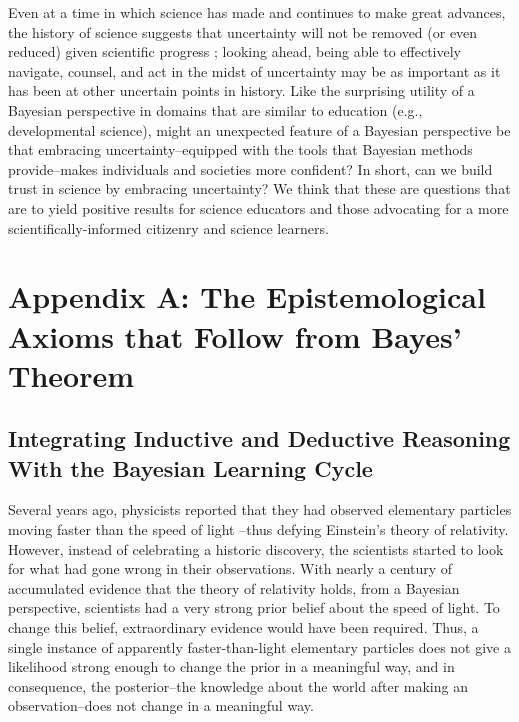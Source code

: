 \documentclass[man, floatsintext]{apa7} %
\begin{document}
Even at a time in which science has made and continues to make great advances, the history of science suggests that uncertainty will not be removed (or even reduced) given scientific progress \parencite{fara2010science}; looking ahead, being able to effectively navigate, counsel, and act in the midst of uncertainty may be as important as it has been at other uncertain points in history. Like the surprising utility of a Bayesian perspective in domains that are similar to education (e.g., developmental science), might an unexpected feature of a Bayesian perspective be that embracing uncertainty--equipped with the tools that Bayesian methods provide--makes individuals and societies more confident? In short, can we build trust in science by embracing uncertainty? We think that these are questions that are  to yield positive results for science educators and those advocating for a more scientifically-informed citizenry and science learners. \\

\printbibliography

\newpage

\section{Appendix A: The Epistemological Axioms that Follow from Bayes' Theorem}

\subsection{Integrating Inductive and Deductive Reasoning With the Bayesian Learning Cycle}

Several years ago, physicists reported that they had observed elementary particles moving faster than the speed of light \parencite{b11}--thus defying Einstein’s theory of relativity. However, instead of celebrating a historic discovery, the scientists started to look for what had gone wrong in their observations. With nearly a century of accumulated evidence that the theory of relativity holds, from a Bayesian perspective, scientists had a very strong prior belief about the speed of light. To change this belief, extraordinary evidence would have been required. Thus, a single instance of apparently faster-than-light elementary particles does not give a likelihood strong enough to change the prior in a meaningful way, and in consequence, the posterior--the knowledge about the world after making an observation--does not change in a meaningful way. \\
\end{document}
